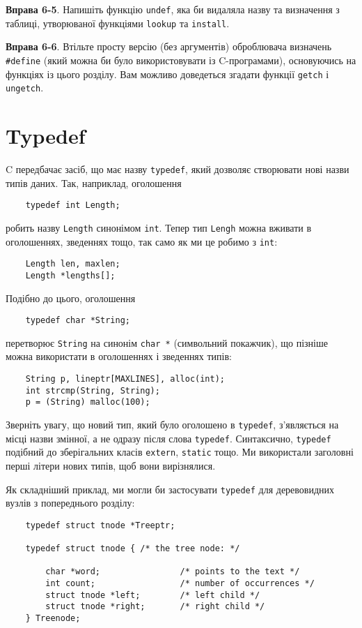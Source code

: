 \documentclass[a4paper,12pt]{book}
\begin{document}
  \textbf{Вправа 6-5}. Напишіть функцію \texttt{undef}, яка би видаляла назву та визначення
  з таблиці, утворюваної функціями \texttt{lookup} та \texttt{install}.

  \textbf{Вправа 6-6}. Втільте просту версію (без аргументів) оброблювача визначень
  \texttt{\#define} (який можна би було використовувати із C-програмами), основуючись на
  функціях із цього розділу. Вам можливо доведеться згадати функції \texttt{getch} і
  \texttt{ungetch}.

\section{Typedef}

\label{f0:ch6.7}
  C передбачає засіб, що має назву \texttt{typedef}, який дозволяє створювати нові назви
  типів даних. Так, наприклад, оголошення
  \begin{verbatim}
    typedef int Length;
  \end{verbatim}
  робить назву \texttt{Length} синонімом \texttt{int}. Тепер тип \texttt{Lengh} можна
  вживати в оголошеннях, зведеннях тощо, так само як ми це робимо з \texttt{int}:
  \begin{verbatim}
    Length len, maxlen;
    Length *lengths[];
  \end{verbatim}

  Подібно до цього, оголошення
  \begin{verbatim}
    typedef char *String;
  \end{verbatim}
  перетворює \texttt{String} на синонім \texttt{char *} (символьний покажчик), що пізніше
  можна використати в оголошеннях і зведеннях типів:
  \begin{verbatim}
    String p, lineptr[MAXLINES], alloc(int);
    int strcmp(String, String);
    p = (String) malloc(100);
  \end{verbatim}

  Зверніть увагу, що новий тип, який було оголошено в \texttt{typedef}, з'являється на
  місці назви змінної, а не одразу після слова \texttt{typedef}. Синтаксично,
  \texttt{typedef} подібний до зберігальних класів \texttt{extern}, \texttt{static} тощо.
  Ми використали заголовні перші літери нових типів, щоб вони вирізнялися.

  Як складніший приклад, ми могли би застосувати \texttt{typedef} для деревовидних вузлів
  з попереднього розділу:
  \begin{verbatim}
    typedef struct tnode *Treeptr;

    typedef struct tnode { /* the tree node: */

        char *word;                /* points to the text */
        int count;                 /* number of occurrences */
        struct tnode *left;        /* left child */
        struct tnode *right;       /* right child */
    } Treenode;
  \end{verbatim}
\end{document}
